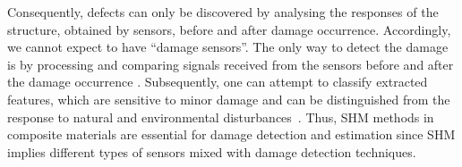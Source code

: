 Consequently, defects can only be discovered by analysing the responses of the structure, obtained by sensors, before and after damage occurrence.
Accordingly, we cannot expect to have “damage sensors”.
The only way to detect the damage is by processing and comparing signals received from the sensors before and after the damage occurrence \cite{s18041094}. 
Subsequen\-tly, one can attempt to classify extracted features, which are sensitive to minor damage and can be distinguished from the response to natural and environmental disturbances~\cite{s18041094}. 
Thus, SHM  methods in composite materials are essential for damage detection and estimation since SHM implies different types of sensors mixed with damage detection techniques.